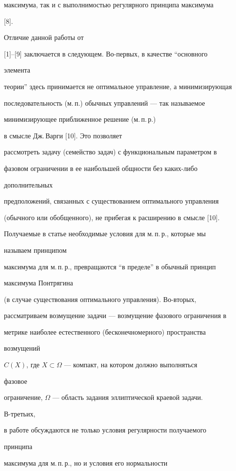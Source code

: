 максимума, так и с выполнимостью регулярного принципа максимума 


[8].


 


Отличие данной работы от 


[1]--[9] заключается в следующем. Во-первых, в качестве ``основного 


элемента 


теории'' здесь принимается не оптимальное управление, а минимизирующая 


последовательность (м.\,п.) обычных управлений --- так называемое 


минимизирующее приближенное решение (м.\,п.\,р.) 


в смысле Дж.\,Варги [10]. Это позволяет 


рассмотреть задачу (семейство задач) с функциональным параметром в 


фазовом ограничении в ее наибольшей общности без каких-либо 


дополнительных 


предположений, связанных с существованием оптимального управления


(обычного или обобщенного), не прибегая к расширению в смысле [10]. 


Получаемые в статье необходимые условия для м.\,п.\,р., которые мы 


называем принципом 


максимума для м.\,п.\,р., превращаются ``в пределе'' в обычный принцип 


максимума Понтрягина


(в случае существования оптимального управления). Во-вторых, 


рассматриваем возмущение задачи --- возмущение фазового ограничения в 


метрике наиболее естественного (бесконечномерного) пространства 


возмущений 


$C(X)$, где $X\subset\Omega$ --- компакт, на котором должно выполняться 


фазовое 


ограничение, $\Omega$ --- область задания эллиптической краевой задачи. 


В-третьих, 


в работе обсуждаются не только условия регулярности получаемого 


принципа 


максимума для м.\,п.\,р., но и условия его нормальности 


